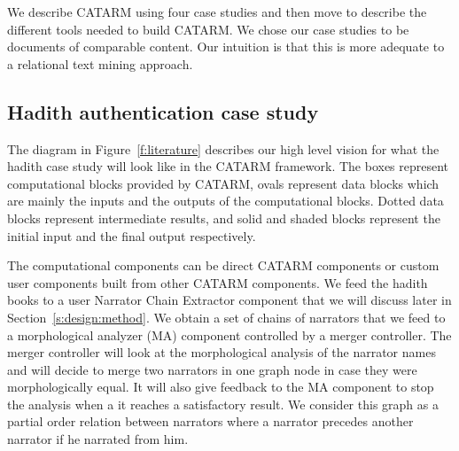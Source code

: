 \documentclass[12pt]{article}
\begin{document}
We describe CATARM using four case studies and then move
to describe the different tools needed to build
CATARM.
We chose our case studies to be documents of comparable
content. 
Our intuition is that this is more 
adequate to a relational text mining approach.

\subsection{Hadith authentication case study}
\label{s:design:lit}

\begin{figure}
\end{figure}

The diagram in Figure~\ref{f:literature} describes our 
high level vision for what the hadith case study
will look like in the CATARM framework. 
The boxes represent 
computational blocks provided by CATARM, 
ovals represent data blocks which are mainly the 
inputs and the outputs of the computational blocks. 
Dotted data blocks represent intermediate results,
and solid and shaded blocks represent the initial input 
and the final output respectively. 

The computational components can be direct CATARM components
or custom user components built from other CATARM components.
We feed the hadith books to a user Narrator Chain Extractor
component that we will discuss later in 
Section~\ref{s:design:method}. We  obtain a set of chains
of narrators that we feed to a morphological analyzer (MA) 
component controlled by a merger controller. 
The merger controller will look at the morphological analysis
of the narrator names and will decide to merge two narrators in 
one graph node in case they were morphologically equal. 
It will also give feedback to the MA component to stop the
analysis when a it reaches a satisfactory result.
We consider this graph as a partial order relation between 
narrators where a narrator precedes another narrator if 
he narrated from him. 
\end{document}
